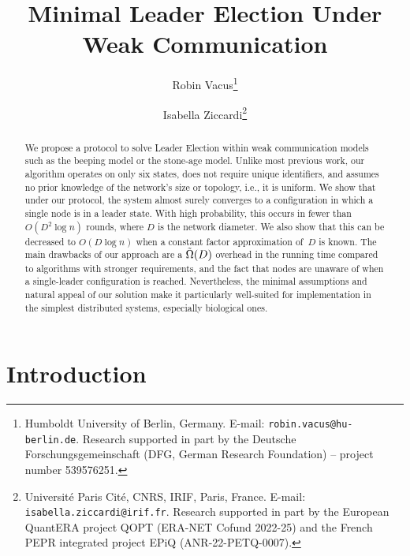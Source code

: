 \documentclass{article}
\title{Minimal Leader Election Under Weak Communication}
\author{Robin Vacus\thanks{Humboldt University of Berlin, Germany. E-mail: \texttt{robin.vacus@hu-berlin.de}. Research supported in part by the Deutsche Forschungsgemeinschaft (DFG, German Research Foundation) – project number 539576251. } \and Isabella Ziccardi\thanks{Université Paris Cité, CNRS, IRIF, Paris, France. E-mail: \texttt{isabella.ziccardi@irif.fr}.  Research supported in part by the European QuantERA project QOPT (ERA-NET Cofund 2022-25) and the French PEPR integrated project EPiQ (ANR-22-PETQ-0007).}}
\date{}
\newcommand{\inote}[1]{{\color{blue} ({\bf Isa:} #1)}}
\begin{document}
\maketitle 


\begin{abstract}
    We propose a protocol to solve Leader Election within weak communication models such as the beeping model or the stone-age model.
    Unlike most previous work, our algorithm operates on only six states, does not require unique identifiers, and assumes no prior knowledge of the network's size or topology, i.e., it is uniform. We show that under our protocol, the system almost surely converges to a configuration in which a single node is in a leader state. With high probability, this occurs in fewer than $O(D^2 \log n)$ rounds, where $D$ is the network diameter. We also show that this can be decreased to $O(D \log n)$ when a constant factor approximation of~$D$ is known.
    The main drawbacks of our approach are a $\Tilde{\Omega}(D)$
    overhead in the running time compared to algorithms with stronger requirements, and the fact that nodes are unaware of when a single-leader configuration is reached. Nevertheless, the minimal assumptions and natural appeal of our solution make it particularly well-suited for implementation in the simplest distributed systems, especially biological ones.
\end{abstract}




\section{Introduction}
\end{document}
